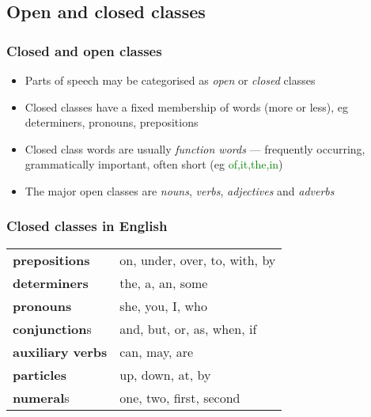 \documentclass{beamer}             %
\begin{document}
\subsection{Open and closed classes}

\begin{frame}
  \frametitle{Closed and open classes}
  \begin{itemize}
  \item Parts of speech may be categorised as \emph{open} or
    \emph{closed} classes
  \item Closed classes have a fixed membership of words (more or
    less), eg determiners, pronouns, prepositions
  \item Closed class words are usually \emph{function words} ---
    frequently occurring, grammatically important, often short (eg
    \textcolor{green}{of,it,the,in})
  \item The major open classes are \emph{nouns}, \emph{verbs},
    \emph{adjectives} and \emph{adverbs}
  \end{itemize}
\end{frame}

\begin{frame}
  \frametitle{Closed classes in English}
  \textcolor{black}{
  \begin{tabular}{ll}
  \textbf{prepositions} & on, under, over, to, with, by\\
  \textbf{determiners} & the, a, an, some\\
  \textbf{pronouns} & she, you, I, who\\
  \textbf{conjunction}s & and, but, or, as, when, if\\
  \textbf{auxiliary verbs} & can, may, are\\
  \textbf{particles} & up, down, at, by\\
  \textbf{numeral}s & one, two, first, second\\
  \end{tabular}}
\end{frame}
\end{document}
